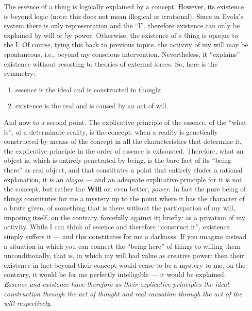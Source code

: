 The essence of a thing is logically explained by a concept. However, its existence is beyond logic (note: this does not mean illogical or irrational). Since in Evola's system there is only representation and the ``I'', therefore existence can only be explained by will or by power. Otherwise, the existence of a thing is opaque to the I. Of course, tying this back to previous topics, the activity of my will may be spontaneous, i.e., beyond my conscious intervention. Nevertheless, it ``explains'' existence without resorting to theories of external forces. So, here is the symmetry:

\begin{enumerate}


\item essence is the ideal and is constructed in thought

\item existence is the real and is caused by an act of will.
\end{enumerate}

\begin{quotex}
And now to a second point. The explicative principle of the essence, of the ``what is'', of a determinate reality, is the concept: when a reality is genetically constructed by means of the concept in all the characteristics that determine it, the explicative principle in the order of essence is exhausted. Therefore, what an object is, which is entirely penetrated by being, is the bare fact of its ``being there'' as real object, and that constitutes a point that entirely eludes a rational explanation, it is an \emph{alogos} --- and an adequate explicative principle for it is not the concept, but rather the \textbf{Will} or, even better, \emph{power}. In fact the pure being of things constitutes for me a mystery up to the point where it has the character of a brute given, of something that is there without the participation of my will, imposing itself, on the contrary, forcefully against it; briefly: as a privation of my activity. While I can think of essence and therefore ``construct it'', existence simply suffers it --- and this constitutes for me a darkness. If you imagine instead a situation in which you can connect the ``being here'' of things to willing them unconditionally, that is, in which my will had value as creative power: then their existence in fact beyond their concept would cease to be a mystery to me, on the contrary, it would be for me perfectly intelligible --- it would be explained. \emph{Essence and existence have therefore as their explicative principles the ideal construction through the act of thought and real causation through the act of the will respectively}.
\end{quotex}


